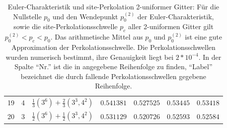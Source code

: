 \begin{table}[tbp]
\begin{tabular}{|r|r|l|r|r|r||r|}
19&4&$\frac{1}{3}(3^6)+\frac{2}{3}(3^3,4^2)$&$0.541381$&$0.527525$&$0.53445$&$0.53418$\\
20&3&$\frac{1}{2}(3^6)+\frac{1}{2}(3^3,4^2)$&$0.531129$&$0.520726$&$0.52593$&$0.52584$\\
\hline
\end{tabular}
\caption{Euler-Charakteristik und site-Perkolation 2-uniformer Gitter: F\"ur die Nullstelle $p_0$ und den Wendepunkt $p_0^{(2)}$ der Euler-Charakteristik, sowie die site-Perkolationsschwelle $p_c$ aller 2-uniformen Gitter gilt $p_0^{(2)}<p_c<p_0$. Das arithmetische Mittel aus $p_0$ und $p_0^{(2)}$ ist eine gute Approximation der Perkolationsschwelle. Die Perkolationsschwellen wurden numerisch bestimmt, ihre Genauigkeit liegt bei $2*10^{-4}$. In der Spalte ``Nr.''  ist die in \cite{Gruenbaum:86} angegebene Reihenfolge zu finden, ``Label'' bezeichnet die durch fallende Perkolationsschwellen gegebene Reihenfolge.}
\label{tab:2-uniform}
\end{table}

\clearpage

